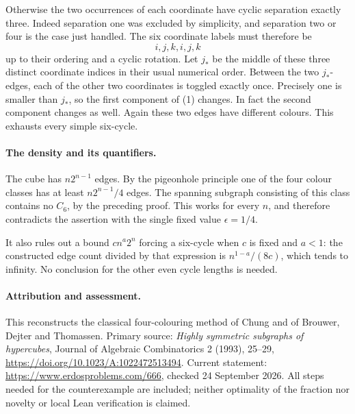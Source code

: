 Otherwise the two occurrences of each coordinate have cyclic separation exactly three. Indeed separation one was excluded by simplicity, and separation two or four is the case just handled. The six coordinate labels must therefore be
\[
 i,j,k,i,j,k
\]
up to their ordering and a cyclic rotation. Let \(j_*\) be the middle of these three distinct coordinate indices in their usual numerical order. Between the two \(j_*\)-edges, each of the other two coordinates is toggled exactly once. Precisely one is smaller than \(j_*\), so the first component of (1) changes. In fact the second component changes as well. Again these two edges have different colours. This exhausts every simple six-cycle.

\paragraph{The density and its quantifiers.}
The cube has \(n2^{n-1}\) edges. By the pigeonhole principle one of the four colour classes has at least \(n2^{n-1}/4\) edges. The spanning subgraph consisting of this class contains no \(C_6\), by the preceding proof. This works for every \(n\), and therefore contradicts the assertion with the single fixed value \(\epsilon=1/4\).

It also rules out a bound \(cn^a2^n\) forcing a six-cycle when \(c\) is fixed and \(a<1\): the constructed edge count divided by that expression is \(n^{1-a}/(8c)\), which tends to infinity. No conclusion for the other even cycle lengths is needed.

\paragraph{Attribution and assessment.}
This reconstructs the classical four-colouring method of Chung and of Brouwer, Dejter and Thomassen. Primary source: \emph{Highly symmetric subgraphs of hypercubes}, Journal of Algebraic Combinatorics 2 (1993), 25--29, \url{https://doi.org/10.1023/A:1022472513494}. Current statement: \url{https://www.erdosproblems.com/666}, checked 24 September 2026. All steps needed for the counterexample are included; neither optimality of the fraction nor novelty or local Lean verification is claimed.
